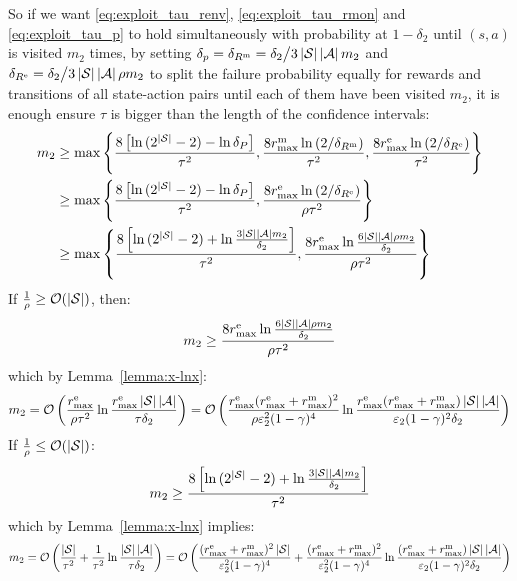So if we want \cref{eq:exploit_tau_renv}, \cref{eq:exploit_tau_rmon} and \cref{eq:exploit_tau_p} to hold simultaneously with probability at $1 - \delta_2$ until $(s, a)$ is visited $m_2$ times, by setting $\delta_p = \delta_{R^\text{m}} = \delta_2 \big/ 3\left \lvert \mathcal{S} \right \rvert\left \lvert \mathcal{A} \right \rvert m_2$ and $\delta_{R^\text{e}} = \delta_2 \big/ 3\left \lvert \mathcal{S} \right \rvert\left \lvert \mathcal{A} \right \rvert\rho m_2$ to split the failure probability equally for rewards and transitions of all state-action pairs until each of them have been visited $m_2$, it is enough ensure $\tau$ is bigger than the length of the confidence intervals:
\begin{align*}
     m_2 & \geq \max \left\{\frac{8\left[\ln{(2^{|\mathcal{S}|} - 2)} - \ln{\delta_P}\right]}{\tau^2}, \frac{8r_{\text{max}}^\text{m}\ln{(2/\delta_{R^\text{m}})}}{\tau^2},
    \frac{8r_{\text{max}}^\text{e}\ln{(2/\delta_{R^\text{e}})}}{\tau^2} \right\} \\
    & \geq \max \left\{\frac{8\left[\ln{(2^{|\mathcal{S}|} - 2)} - \ln{\delta_P}\right]}{\tau^2},
    \frac{8r_{\text{max}}^\text{e}\ln{(2/\delta_{R^\text{e}})}}{\rho \tau^2} \right\} \\
    & \geq \max \left\{\frac{8\left[\ln{(2^{|\mathcal{S}|} - 2)} + \ln{\frac{3\left \lvert \mathcal{S} \right \rvert\left \lvert \mathcal{A} \right \rvert m_2}{\delta_2}}\right]}{\tau^2},
    \frac{8r_{\text{max}}^\text{e}\ln{\frac{6\left \lvert \mathcal{S} \right \rvert\left \lvert \mathcal{A} \right \rvert\rho m_2}{\delta_2}}}{\rho \tau^2} \right\}
\end{align*}
%
If $\frac{1}{\rho} \geq \mathcal{O}(\left \lvert \mathcal{S} \right \rvert)$, then:
%
\begin{equation*}
    m_2 \geq \frac{8r_{\text{max}}^\text{e}\ln{\frac{6\left \lvert \mathcal{S} \right \rvert\left \lvert \mathcal{A} \right \rvert\rho m_2}{\delta_2}}}{\rho \tau^2}
\end{equation*}
%
which by Lemma~\ref{lemma:x-lnx}:
\begin{equation}
    m_2 = \mathcal{O}\left(\frac{r_{\text{max}}^\text{e}}{\rho \tau^2} \ln{\frac{r_{\text{max}}^\text{e}\left \lvert \mathcal{S} \right \rvert\left \lvert \mathcal{A} \right \rvert}{\tau\delta_2}}\right) = \mathcal{O}\left(\frac{r_{\text{max}}^\text{e} (r_{\text{max}}^\text{e} + r_{\text{max}}^\text{m})^2}{\rho \varepsilon_2^2(1 - \gamma)^4} \ln{\frac{r_{\text{max}}^\text{e}(r_{\text{max}}^\text{e} + r_{\text{max}}^\text{m})\left \lvert \mathcal{S} \right \rvert\left \lvert \mathcal{A} \right \rvert}{\varepsilon_2(1 - \gamma)^2\delta_2}}\right)
\end{equation}
%
If $\frac{1}{\rho} \leq \mathcal{O}(\left \lvert \mathcal{S} \right \rvert)$:
\begin{equation*}
    m_2 \geq \frac{8\left[\ln{(2^{|\mathcal{S}|} - 2)} + \ln{\frac{3\left \lvert \mathcal{S} \right \rvert\left \lvert \mathcal{A} \right \rvert m_2}{\delta_2}}\right]}{\tau^2}
\end{equation*}
which by Lemma~\ref{lemma:x-lnx} implies:
\begin{equation}
    m_2 = \mathcal{O}\left(\frac{\left \lvert \mathcal{S} \right \rvert}{\tau^2} + \frac{1}{\tau^2}\ln{\frac{\left \lvert \mathcal{S} \right \rvert\left \lvert \mathcal{A} \right \rvert}{\tau\delta_2}}\right) = \mathcal{O}\left(\frac{(r_{\text{max}}^\text{e} + r_{\text{max}}^\text{m})^2\left \lvert \mathcal{S} \right \rvert}{\varepsilon_2^2(1 - \gamma)^4} + \frac{(r_{\text{max}}^\text{e} + r_{\text{max}}^\text{m})^2}{\varepsilon_2^2(1 - \gamma)^4}\ln{\frac{(r_{\text{max}}^\text{e} + r_{\text{max}}^\text{m})\left \lvert \mathcal{S} \right \rvert\left \lvert \mathcal{A} \right \rvert}{\varepsilon_2(1 - \gamma)^2\delta_2}}\right)
\end{equation}
%
